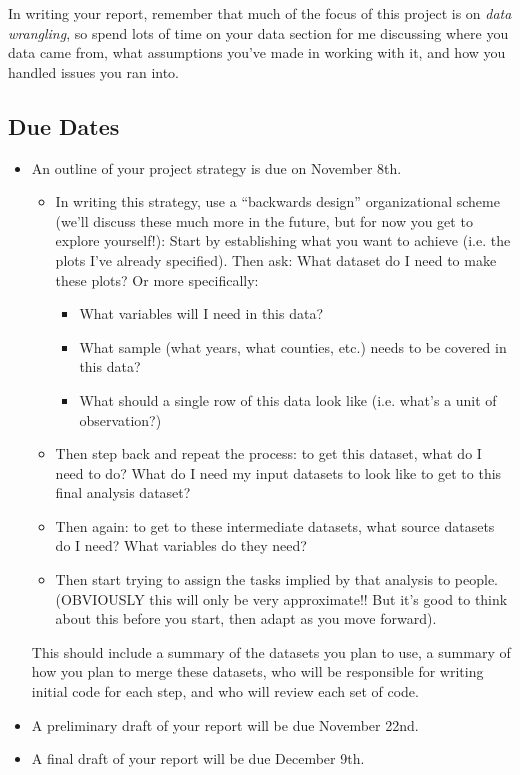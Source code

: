 \documentclass[12pt]{article}
\begin{document}
In writing your report, remember that much of the focus of this project is on \emph{data wrangling}, so spend lots of time on your data section for me discussing where you data came from, what assumptions you've made in working with it, and how you handled issues you ran into.

\subsection*{Due Dates}
\begin{itemize}
  \item An outline of your project strategy is due on November 8th.
  \begin{itemize}
    \item In writing this strategy, use a ``backwards design'' organizational scheme (we'll discuss these much more in the future, but for now you get to explore yourself!): Start by establishing what you want to achieve (i.e. the plots I've already specified). Then ask: What dataset do I need to make these plots? Or more specifically:
    \begin{itemize}
      \item What variables will I need in this data?
      \item What sample (what years, what counties, etc.) needs to be covered in this data?
      \item What should a single row of this data look like (i.e. what's a unit of observation?)
    \end{itemize}
    \item Then step back and repeat the process: to get this dataset, what do I need to do? What do I need my input datasets to look like to get to this final analysis dataset?
    \item Then again: to get to these intermediate datasets, what source datasets do I need? What variables do they need?
    \item Then start trying to assign the tasks implied by that analysis to people. (OBVIOUSLY this will only be very approximate!! But it's good to think about this before you start, then adapt as you move forward).
  \end{itemize}
  This should include a summary of the datasets you plan to use, a summary of how you plan to merge these datasets, who will be responsible for writing initial code for each step, and who will review each set of code.
  \item A preliminary draft of your report will be due November 22nd.
  \item A final draft of your report will be due December 9th.
\end{itemize}
\end{document}
